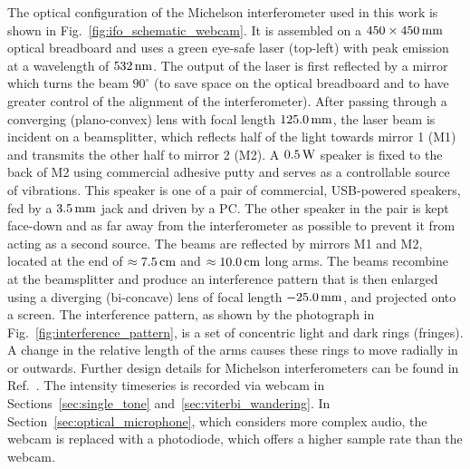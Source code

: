 \documentclass[paper-main.tex]{subfiles}
\begin{document}
The optical configuration of the Michelson interferometer used in this work is shown in Fig.~\ref{fig:ifo_schematic_webcam}.
It is assembled on a $450 \times 450 \,{\rm mm} $ optical breadboard and uses a green eye-safe laser (top-left) with peak emission at a wavelength of $532\,{\rm nm}$.
The output of the laser is first reflected by a mirror which turns the beam $90^{\circ}$ (to save space on the optical breadboard and to have greater control of the alignment of the interferometer).
After passing through a converging (plano-convex) lens with focal length $125.0\,{\rm mm}$, the laser beam is incident on a beamsplitter, which reflects half of the light towards mirror 1 (M1) and transmits the other half to mirror 2 (M2). 
A $0.5\,{\rm W}$ speaker is fixed to the back of M2 using commercial adhesive putty and serves as a controllable source of vibrations. 
This speaker is one of a pair of commercial, USB-powered speakers, fed by a $3.5\,{\rm mm}$ jack and driven by a PC. 
The other speaker in the pair is kept face-down and as far away from the interferometer as possible to prevent it from acting as a second source.
The beams are reflected by mirrors M1 and M2, located at the end of $\approx 7.5\,{\rm cm}$ and $\approx 10.0\,{\rm cm}$ long arms.
The beams recombine at the beamsplitter and produce an interference pattern that is then enlarged using a diverging (bi-concave) lens of focal length $-25.0\,{\rm mm}$, and projected onto a screen.
The interference pattern, as shown by the photograph in Fig.~\ref{fig:interference_pattern}, is a set of concentric light and dark rings (fringes). 
A change in the relative length of the arms causes these rings to move radially in or outwards.
Further design details for Michelson interferometers can be found in Ref.~\cite{TTExhibit:2020}.
The intensity timeseries is recorded via webcam in Sections~\ref{sec:single_tone} and~\ref{sec:viterbi_wandering}.
In Section~\ref{sec:optical_microphone}, which considers more complex audio, the webcam is replaced with a photodiode, which offers a higher sample rate than the webcam. 
\end{document}
